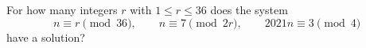 For how many integers $r$ with $1\le r\le36$ does the system
\[n\equiv r\pmod{36},\qquad n\equiv7\pmod{2r},\qquad2021n\equiv3\pmod4\]
have a solution?
